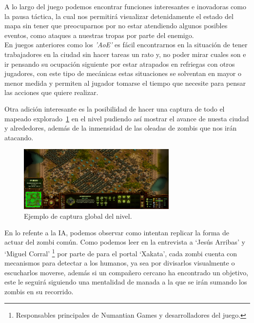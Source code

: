 A lo largo del juego podemos encontrar funciones interesantes e inovadoras como la pausa
táctica, la cual nos permitirá visualizar detenidamente el estado del mapa sin tener que
preocuparnos por no estar atendiendo algunos posibles eventos, como ataques a nuestras
tropas por parte del enemigo.\\ 
En juegos anteriores como los \textit{'\ac{AoE}'} es
fácil encontrarnos en la situación de tener trabajadores en la ciudad sin hacer tareas
un rato y, no poder mirar cuales son e ir pensando su ocupación siguiente por estar
atrapados en refriegas con otros jugadores, con este tipo de mecánicas estas situaciones
se solventan en mayor o menor medida y permiten al jugador tomarse el tiempo que
necesite para pensar las acciones que quiere realizar.

Otra adición interesante es la posibilidad de hacer una captura de todo el mapeado explorado~\ref{img:tab_4}
en el nivel pudiendo así mostrar el avance de nuesta ciudad y alrededores, además de la 
inmensidad de las oleadas de zombis que nos irán atacando.

\begin{figure}[ht]
\centering
\includegraphics[width=0.7\textwidth]{imagenes/marco_teo/referentes/tab_4.png}
\caption{Ejemplo de captura global del nivel.}
\label{img:tab_4}
\end{figure}

En lo refente a la \ac{IA}, podemos observar como intentan replicar la forma de actuar del
zombi común. Como podemos leer en la entrevista a `Jesús Arribas' y `Miguel Corral'
\footnote{Responsables principales de Numantian Games y desarrolladores del juego.} por parte
de \citeauthor*{Sucasas2018} para el portal `Xakata', cada zombi cuenta con mecanismos para 
detectar a los humanos, ya sea por divisarlos visualmente o escucharlos moverse, además si un 
compañero cercano ha encontrado un objetivo, este le seguirá siguiendo 
una mentalidad de manada a la que se irán sumando los zombis en su recorrido.


